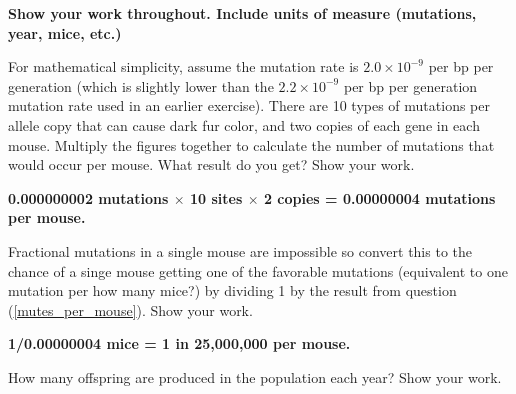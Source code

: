 \documentclass[11pt, addpoints]{exam}
\begin{document}
\textbf{Show your work throughout. Include units of measure (mutations, year, mice, etc.)}
\begin{questions}

\question[1]
\label{mutes_per_mouse}For mathematical simplicity, assume the mutation rate is $2.0
\times 10^{-9}$ per bp per generation (which is slightly lower
than the $2.2 \times 10^{-9}$ per bp per generation mutation
rate used in an earlier exercise). There are 10 types of mutations per
allele copy that can cause dark fur color, and two copies of each gene
in each mouse. Multiply the figures together to calculate the number of
mutations that would occur per mouse. What result do you get? Show your work.

\ifprintanswers\vspace{\baselineskip}
	\textbf{0.000000002 mutations $\times$ 10 sites $\times$ 2 copies = 0.00000004 mutations per mouse.}
\else
\fi

\question[1]
\label{how_many_mice}Fractional mutations in a single mouse are impossible so
convert this to the chance of a singe mouse getting one of the favorable
mutations (equivalent to one mutation per how many mice?) by dividing 1
by the result from question (\ref{mutes_per_mouse}). Show your work.

\ifprintanswers\vspace{\baselineskip}
	\textbf{1/0.00000004 mice = 1 in 25,000,000 per mouse.}
\else
\fi

\newpage

\question[1]
\label{how_many_offspring}How many offspring are produced in the population each year? Show your work.


\end{questions}
\end{document}
